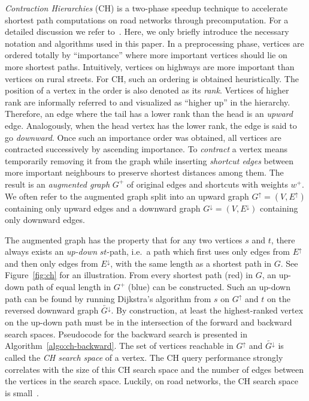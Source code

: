 \documentclass[manuscript,review]{acmart}
\newcommand*{\gchu}{G^{\uparrow}}
\newcommand*{\gchd}{G^{\downarrow}}
\newcommand*{\rgchd}{\overleftarrow{G^{\downarrow}}}
\newcommand*{\echu}{E^{\uparrow}}
\newcommand*{\echd}{E^{\downarrow}}
\begin{document}
\emph{Contraction Hierarchies} (CH) is a two-phase speedup technique to accelerate shortest path computations on road networks through precomputation.
For a detailed discussion we refer to~\cite{gssv-erlrn-12}.
Here, we only briefly introduce the necessary notation and algorithms used in this paper.
In a preprocessing phase, vertices are ordered totally by ``importance'' where more important vertices should lie on more shortest paths.
Intuitively, vertices on highways are more important than vertices on rural streets.
For CH, such an ordering is obtained heuristically.
The position of a vertex in the order is also denoted as its \emph{rank}.
Vertices of higher rank are informally referred to and visualized as ``higher up'' in the hierarchy.
Therefore, an edge where the tail has a lower rank than the head is an \emph{upward} edge.
Analogously, when the head vertex has the lower rank, the edge is said to go \emph{downward}.
Once such an importance order was obtained, all vertices are contracted successively by ascending importance.
To \emph{contract} a vertex means temporarily removing it from the graph while inserting \emph{shortcut edges} between more important neighbours to preserve shortest distances among them.
The result is an \emph{augmented graph} $G^+$ of original edges and shortcuts with weights $w^+$.
We often refer to the augmented graph split into an upward graph $\gchu = (V, \echu)$ containing only upward edges and a downward graph $\gchd = (V, \echd)$ containing only downward edges.

The augmented graph has the property that for any two vertices $s$ and $t$, there always exists an \emph{up-down} $st$-path, i.e.\ a path which first uses only edges from $\echu$ and then only edges from $\echd$, with the same length as a shortest path in $G$.
See Figure~\ref{fig:ch} for an illustration.
From every shortest path (red) in $G$, an up-down path of equal length in $G^+$ (blue) can be constructed.
Such an up-down path can be found by running Dijkstra's algorithm from $s$ on $\gchu$ and $t$ on the reversed downward graph $\rgchd$.
By construction, at least the highest-ranked vertex on the up-down path must be in the intersection of the forward and backward search spaces.
Pseudocode for the backward search is presented in Algorithm~\ref{algo:ch-backward}.
The set of vertices reachable in $\gchu$ and $\rgchd$ is called the \emph{CH search space} of a vertex.
The CH query performance strongly correlates with the size of this CH search space and the number of edges between the vertices in the search space.
Luckily, on road networks, the CH search space is small~\cite{gssv-erlrn-12,dgpw-crprn-13}.
\end{document}
